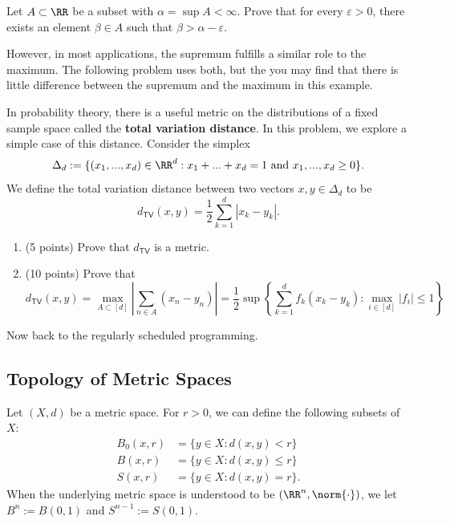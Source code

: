 \documentclass[11pt]{article}
\begin{document}
    \begin{prob} [5 points]
        Let $A \subset \RR$ be a subset with $\alpha = \sup A < \infty$. Prove that for every $\varepsilon > 0$, there exists an element $\beta \in A$ such that $\beta > \alpha - \varepsilon$. 
    \end{prob}

    However, in most applications, the supremum fulfills a similar role to the maximum. The following problem uses both, but the you may find that there is little difference between the supremum and the maximum in this example.  
    \begin{prob} [15 points]
        In probability theory, there is a useful metric on the distributions of a fixed sample space called the \textbf{total variation distance}. In this problem, we explore a simple case of this distance. Consider the simplex
        \[
            \Delta_d := \{(x_1, ..., x_d) \in \RR^d : x_1 + ... + x_d = 1 \text{ and } x_1, ..., x_d \geq 0\}.
        \]
        We define the total variation distance between two vectors $x, y \in \Delta_d$ to be 
        \[
            d_{\mathsf{TV}} (x, y) = \frac{1}{2}  \sum_{k = 1}^d |x_k - y_k|.
        \]
        \begin{enumerate}[label = (\alph*)]
            \item (5 points) Prove that $d_{\mathsf{TV}}$ is a metric.
            
            \item (10 points) Prove that 
            \[
                d_{\mathsf{TV}}(x, y) = \max_{A \subset [d]} \left | \sum_{n \in A} (x_n - y_n) \right | = \frac{1}{2}\sup \left \{ \sum_{k = 1}^d f_k (x_k - y_k) : \max_{i \in [d]} |f_i| \leq 1 \right \}
            \] 
        \end{enumerate}
    \end{prob}
    Now back to the regularly scheduled programming. 

    \subsection{Topology of Metric Spaces} 
    
    \begin{defn}
        Let $(X, d)$ be a metric space. For $r > 0$, we can define the following subsets of $X$:
        \begin{align*}
            B_0(x, r) & = \{y \in X : d(x, y) < r\} \\
            B(x, r) & = \{y \in X : d(x, y) \leq r \} \\
            S(x, r) & = \{y \in X : d(x, y) = r\}.
        \end{align*}  
        When the underlying metric space is understood to be $(\RR^n, \norm{\cdot})$, we let $B^n := B(0, 1)$ and $S^{n-1} := S(0, 1)$. 
    \end{defn}
    
\end{document}

